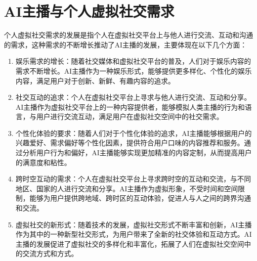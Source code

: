 \documentclass[11pt, a4paper, oneside]{ctexbook}
\begin{document}
\section{AI主播与个人虚拟社交需求}
个人虚拟社交需求的发展是指个人在虚拟社交平台上与他人进行交流、互动和沟通的需求，这种需求的不断增长推动了AI主播的发展，主要体现在以下几个方面：
\begin{enumerate}
    \item 娱乐需求的增长：随着社交媒体和虚拟社交平台的普及，人们对于娱乐内容的需求不断增长。AI主播作为一种娱乐形式，能够提供更多样化、个性化的娱乐内容，满足用户对于创新、新鲜、有趣内容的追求。
    \item 社交互动的追求：个人在虚拟社交平台上寻求与他人进行交流、互动和分享。AI主播作为虚拟社交平台上的一种内容提供者，能够模拟人类主播的行为和语言，与用户进行交流互动，满足用户在虚拟社交空间中的社交需求。
    \item 个性化体验的要求：随着人们对于个性化体验的追求，AI主播能够根据用户的兴趣爱好、需求偏好等个性化因素，提供符合用户口味的内容推荐和服务。通过分析用户行为和偏好，AI主播能够实现更加精准的内容定制，从而提高用户的满意度和粘性。
    \item 跨时空互动的需求：个人在虚拟社交平台上寻求跨时空的互动和交流，与不同地区、国家的人进行交流和分享。AI主播作为虚拟形象，不受时间和空间限制，能够为用户提供跨地域、跨时区的互动体验，促进人与人之间的跨界沟通和交流。
    \item 虚拟社交的新形式：随着技术的发展，虚拟社交形式不断丰富和创新，AI主播作为其中的一种新型社交形式，为用户带来了全新的社交体验和互动方式。AI主播的发展促进了虚拟社交的多样化和丰富化，拓展了人们在虚拟社交空间中的交流方式和方式。
\end{enumerate}
\end{document}
